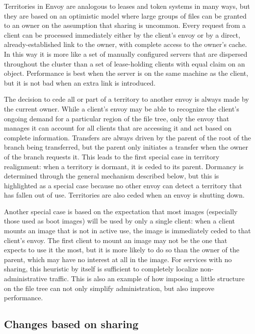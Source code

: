 Territories in Envoy are analogous to leases and token systems in many ways, but they are based on an optimistic model where large groups of files can be granted to an owner on the assumption that sharing is uncommon. Every request from a client can be processed immediately either by the client's envoy or by a direct, already-established link to the owner, with complete access to the owner's cache. In this way it is more like a set of manually configured servers that are dispersed throughout the cluster than a set of lease-holding clients with equal claim on an object. Performance is best when the server is on the same machine as the client, but it is not bad when an extra link is introduced.

The decision to cede all or part of a territory to another envoy is always made by the current owner. While a client's envoy may be able to recognize the client's ongoing demand for a particular region of the file tree, only the envoy that manages it can account for all clients that are accessing it and act based on complete information. Transfers are always driven by the parent of the root of the branch being transferred, but the parent only initiates a transfer when the owner of the branch requests it. This leads to the first special case in territory realignment: when a territory is dormant, it is ceded to its parent. Dormancy is determined through the general mechanism described below, but this is highlighted as a special case because no other envoy can detect a territory that has fallen out of use. Territories are also ceded when an envoy is shutting down.

Another special case is based on the expectation that most images (especially those used as boot images) will be used by only a single client: when a client mounts an image that is not in active use, the image is immediately ceded to that client's envoy. The first client to mount an image may not be the one that expects to use it the most, but it is more likely to do so than the owner of the parent, which may have no interest at all in the image. For services with no sharing, this heuristic by itself is sufficient to completely localize non-administrative traffic. This is also an example of how imposing a little structure on the file tree can not only simplify administration, but also improve performance.

\subsection{Changes based on sharing}

